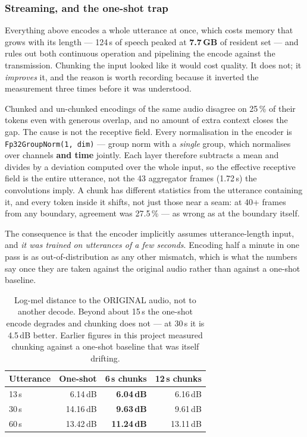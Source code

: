\subsubsection{Streaming, and the one-shot trap}
\label{sec:voice_stream}

Everything above encodes a whole utterance at once, which costs memory
that grows with its length --- 124\,s of speech peaked at
\textbf{7.7\,GB} of resident set --- and rules out both continuous
operation and pipelining the encode against the transmission.  Chunking
the input looked like it would cost quality.  It does not; it
\emph{improves} it, and the reason is worth recording because it
inverted the measurement three times before it was understood.

Chunked and un-chunked encodings of the same audio disagree on 25\,\% of
their tokens even with generous overlap, and no amount of extra context
closes the gap.  The cause is not the receptive field.  Every
normalisation in the encoder is \texttt{Fp32GroupNorm(1, dim)} --- group
norm with a \emph{single} group, which normalises over channels
\textbf{and time} jointly.  Each layer therefore subtracts a mean and
divides by a deviation computed over the whole input, so the effective
receptive field is the entire utterance, not the 43 aggregator frames
(1.72\,s) the convolutions imply.  A chunk has different statistics from
the utterance containing it, and every token inside it shifts, not just
those near a seam: at 40+ frames from any boundary, agreement was
27.5\,\% --- as wrong as at the boundary itself.

The consequence is that the encoder implicitly assumes utterance-length
input, and \emph{it was trained on utterances of a few seconds}.
Encoding half a minute in one pass is as out-of-distribution as any
other mismatch, which is what the numbers say once they are taken
against the original audio rather than against a one-shot baseline.

\begin{table}[H]
    \centering
    \caption{Log-mel distance to the ORIGINAL audio, not to another
             decode.  Beyond about 15\,s the one-shot encode degrades
             and chunking does not --- at 30\,s it is 4.5\,dB better.
             Earlier figures in this project measured chunking against
             a one-shot baseline that was itself drifting.}
    \label{tab:voice_stream_len}
    \small
    \begin{tabular}{@{}lrrr@{}}
    \toprule
    \textbf{Utterance} & \textbf{One-shot} & \textbf{6\,s chunks} &
    \textbf{12\,s chunks} \\
    \midrule
    13\,s &  6.14\,dB & \textbf{6.04\,dB} &  6.16\,dB \\
    30\,s & 14.16\,dB & \textbf{9.63\,dB} &  9.61\,dB \\
    60\,s & 13.42\,dB & \textbf{11.24\,dB} & 13.11\,dB \\
    \bottomrule
    \end{tabular}
\end{table}

